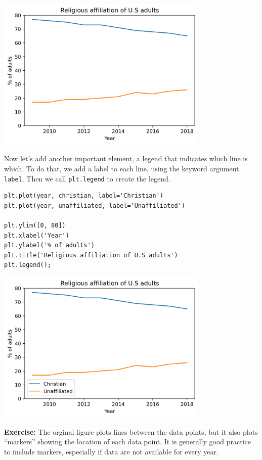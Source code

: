 \begin{center}
\includegraphics[width=4in]{chapters/06_plotting_files/06_plotting_31_0.png}
\end{center}

Now let's add another important element, a legend that indicates which
line is which. To do that, we add a label to each line, using the
keyword argument \passthrough{\lstinline!label!}. Then we call
\passthrough{\lstinline!plt.legend!} to create the legend.

\begin{lstlisting}[]
plt.plot(year, christian, label='Christian')
plt.plot(year, unaffiliated, label='Unaffiliated')

plt.ylim([0, 80])
plt.xlabel('Year')
plt.ylabel('% of adults')
plt.title('Religious affiliation of U.S adults')
plt.legend();
\end{lstlisting}

\begin{center}
\includegraphics[width=4in]{chapters/06_plotting_files/06_plotting_33_0.png}
\end{center}

\textbf{Exercise:} The orginal figure plots lines between the data
points, but it also plots ``markers'' showing the location of each data
point. It is generally good practice to include markers, especially if
data are not available for every year.

